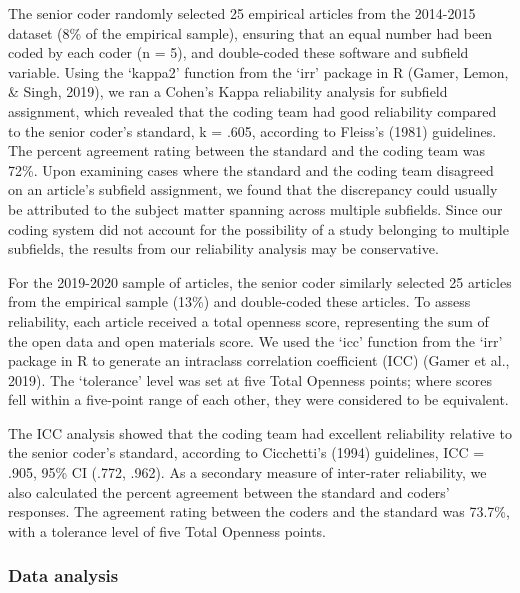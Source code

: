 \documentclass[
  english,
  man,floatsintext]{apa6}
\begin{document}
The senior coder randomly selected 25 empirical articles from the 2014-2015 dataset (8\% of the empirical sample), ensuring that an equal number had been coded by each coder (n = 5), and double-coded these software and subfield variable. Using the `kappa2' function from the `irr' package in R (Gamer, Lemon, \& Singh, 2019), we ran a Cohen's Kappa reliability analysis for subfield assignment, which revealed that the coding team had good reliability compared to the senior coder's standard, k = .605, according to Fleiss's (1981) guidelines. The percent agreement rating between the standard and the coding team was 72\%. Upon examining cases where the standard and the coding team disagreed on an article's subfield assignment, we found that the discrepancy could usually be attributed to the subject matter spanning across multiple subfields. Since our coding system did not account for the possibility of a study belonging to multiple subfields, the results from our reliability analysis may be conservative.

For the 2019-2020 sample of articles, the senior coder similarly selected 25 articles from the empirical sample (13\%) and double-coded these articles. To assess reliability, each article received a total openness score, representing the sum of the open data and open materials score. We used the `icc' function from the `irr' package in R to generate an intraclass correlation coefficient (ICC) (Gamer et al., 2019). The `tolerance' level was set at five Total Openness points; where scores fell within a five-point range of each other, they were considered to be equivalent.

The ICC analysis showed that the coding team had excellent reliability relative to the senior coder's standard, according to Cicchetti's (1994) guidelines, ICC = .905, 95\% CI (.772, .962). As a secondary measure of inter-rater reliability, we also calculated the percent agreement between the standard and coders' responses. The agreement rating between the coders and the standard was 73.7\%, with a tolerance level of five Total Openness points.

\hypertarget{data-analysis}{%
\subsubsection{Data analysis}\label{data-analysis}}
\end{document}

